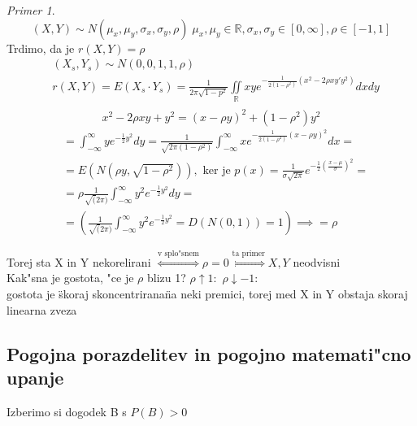 \documentclass[a4paper,12pt]{article}
\theoremstyle{definition}
\theoremstyle{remark}
\newtheorem*{ex}{Primer}
\newcommand{\R}{\mathbb{R}}
\begin{document}
\begin{ex}
    \begin{equation*}
        (X,Y) \sim N(\mu_x, \mu_y, \sigma_x, \sigma_y, \rho) \; \mu_x, \mu_y \in \R, \sigma_x, \sigma_y \in [0,\infty], \rho \in [-1,1]
    \end{equation*}
    Trdimo, da je $r(X,Y) = \rho$
    \begin{align*}
        &(X_s,Y_s) \sim N(0,0,1,1,\rho) \\
        &r(X,Y) = E(X_s \cdot Y_s) = \frac{1}{2\pi \sqrt{1-p^2}} \underset{\R}{\iint} x y 
            e^{-\frac{1}{2(1-\rho^2)} (x^2 - 2\rho xy ' y^2)} dx dy \\
    \end{align*}
    \begin{equation*}
        x^2 - 2 \rho xy + y^2 = (x-\rho y)^2 + (1-\rho^2)y^2
    \end{equation*}
    \begin{align*}
        &= \int_{-\infty}^{\infty} y e^{-\frac{1}{2}y^2} dy = \frac{1}{\sqrt{2\pi (1-\rho^2)}}
        \int_{-\infty}^{\infty} x e^{-\frac{1}{2(1-\rho^2)} (x - \rho y)^2} dx = \\
        &=E(N(\rho y, \sqrt{1-\rho^2})), \text{ ker je } p(x) = \frac{1}{\sigma \sqrt{2\pi}}
        e^{-\frac{1}{2} (\frac{x - \mu}{\sigma})^2} = \\
        &= \rho \frac{1}{\sqrt(2\pi)} \int_{-\infty}^{\infty} y^2 e^{-\frac{1}{2} y^2} dy = \\
        &= (\frac{1}{\sqrt(2\pi)} \int_{-\infty}^{\infty} y^2 e^{-\frac{1}{2} y^2} = D(N(0,1)) = 1) \implies = \rho
    \end{align*}
\end{ex}
Torej sta X in Y nekorelirani $\stackrel{\text{v splo"snem}}{\iff} \rho = 0 \stackrel{\text{ta primer}}{\iff}
X, Y$ neodvisni \\
Kak"sna je gostota, "ce je $\rho$ blizu 1?
$\rho \uparrow 1:$ %
$\rho \downarrow -1:$ \\ %
gostota je \"skoraj skoncentrirana\" na neki premici, torej med X in Y obstaja skoraj linearna zveza

\subsection{Pogojna porazdelitev in pogojno matemati"cno upanje}

Izberimo si dogodek B s $P(B) > 0$
\end{document}
